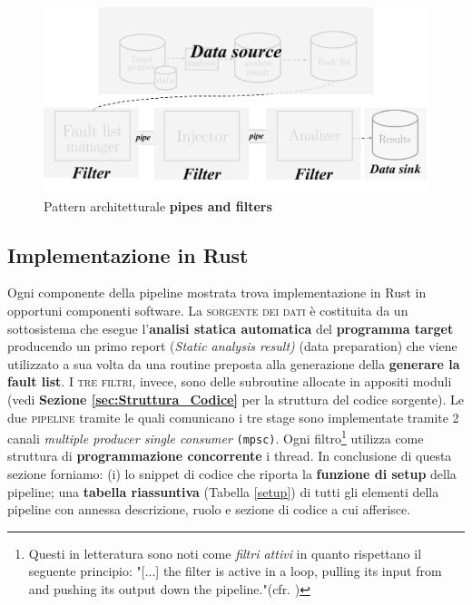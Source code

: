 \begin{figure}[h]
    \centering
    \includegraphics[scale=0.5]{img/pipeline_mapped.png}
    \caption{Pattern architetturale \textbf{pipes and filters}}
\end{figure}

\subsection{Implementazione in Rust}
Ogni componente della pipeline mostrata trova implementazione in Rust in opportuni componenti software. La \textsc{sorgente dei dati} è costituita da un sottosistema che esegue l'\textbf{analisi statica automatica} del \textbf{programma target} producendo un primo report (\textit{Static analysis result)} (data preparation) che viene utilizzato a sua volta da una routine preposta alla generazione della \textbf{generare la fault list}. I \textsc{tre filtri}, invece, sono delle subroutine allocate in appositi moduli (vedi \textbf{Sezione \ref{sec:Struttura_Codice}} per la struttura del codice sorgente). Le due \textsc{pipeline} tramite le quali comunicano i tre stage sono implementate tramite 2 canali \textit{multiple producer single consumer} \texttt{(mpsc)}. Ogni filtro\footnote{
    Questi in letteratura sono noti come \textit{filtri attivi} in quanto rispettano il seguente principio: "[...] the filter is active in a loop, pulling its input from
    and pushing its output down the pipeline."(cfr. \cite{schmidt2013pattern})
} utilizza come struttura di \textbf{programmazione concorrente} i thread.
In conclusione di questa sezione forniamo: (i) lo snippet di codice che riporta la \textbf{funzione di setup} della pipeline; una \textbf{tabella riassuntiva} (Tabella \ref{setup}) di tutti gli elementi della pipeline con annessa descrizione, ruolo e sezione di codice a cui afferisce.\newpage

